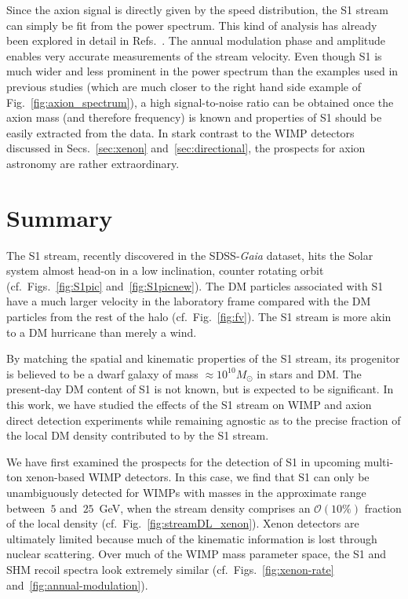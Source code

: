 \documentclass[prd,10pt,twocolumn,showpacs,nofootinbib,aps,superscriptaddress,preprintnumbers]{revtex4-1}
\begin{document}
Since the axion signal is directly given by the speed distribution, the S1 stream can simply be fit from the power spectrum. This kind of analysis has already been explored in detail in Refs.~\cite{OHare:2017yze,Foster:2017hbq,Knirck:2018knd}.
 The annual modulation phase and amplitude enables very accurate measurements of the stream velocity. Even though S1 is much wider and less prominent in the power spectrum than the examples used in previous studies (which are much closer to the right hand side example of Fig.~\ref{fig:axion_spectrum}), a high signal-to-noise ratio can be obtained once the axion mass (and therefore frequency) is known and properties of S1 should be easily extracted from the data. In stark contrast to the WIMP detectors discussed in Secs.~\ref{sec:xenon} and~\ref{sec:directional}, the prospects for axion astronomy are rather extraordinary. 


\section{Summary}\label{sec:summary}

The S1 stream, recently discovered in the SDSS-{\it Gaia} dataset, 
hits the Solar system almost head-on in a low inclination, counter rotating orbit 
(cf.\ Figs.~\ref{fig:S1pic} and~\ref{fig:S1picnew}). 
The DM particles associated with S1 have a much larger velocity in the 
laboratory frame compared with the DM particles from the rest of the halo (cf.\ Fig.~\ref{fig:fv}). The S1 stream is more akin to a DM hurricane than merely a wind.

By matching the spatial and kinematic properties of the S1 stream, 
its progenitor is believed to be a dwarf galaxy of mass $\approx 10^{10} M_\odot$ in stars and DM.
The present-day DM content of S1 is not known, but is expected to be significant. 
In this work, we have studied the effects of the S1 stream on WIMP and axion direct detection experiments 
while remaining agnostic as to the precise fraction of the local DM density contributed to by the S1 stream.

We have first examined the prospects for the detection of S1 in upcoming multi-ton xenon-based WIMP detectors. 
In this case, we find that S1 can only be unambiguously detected for WIMPs with masses in the approximate 
range between~$5$ and~$25$~GeV, when the stream density comprises an $\mathcal{O}(10\%)$
fraction of the local density (cf.\ Fig.~\ref{fig:streamDL_xenon}).
Xenon detectors are ultimately limited because much of the kinematic information is lost through nuclear scattering. Over much of the WIMP mass parameter space, the S1 and SHM recoil spectra look extremely similar 
(cf.~Figs.~\ref{fig:xenon-rate} and~\ref{fig:annual-modulation}).
\end{document}
